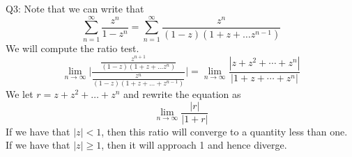 \documentclass[letterpaper]{article}
\begin{document}
\noindent
Q3: Note that we can write that $$\sum_{n=1}^\infty  \frac{z^n}{1-z^n}= \sum_{n=1}^\infty \frac{z^n}{(1-z)(1+ z + \dots z^{n-1})}$$
We will compute the ratio test. $$\lim_{n \to \infty} \Bigg|\frac{\frac{z^{n+1}}{(1-z)(1+ z + \dots z^n)}}{\frac{z^n}{(1-z)(1+ z + \dots + z^{n-1})}} \Bigg| = \lim_{n \to \infty} \frac{|z+ z^2 + \cdots+  z^{n}|}{|1+ z + \cdots + z^n |}$$
We let $r = z+ z^2 + \dots + z^n$ and rewrite the equation as $$\lim_{n\to \infty} \frac{|r|}{|1+r|}$$ If we have that $|z|<1$, then this ratio will converge to a quantity less than one. If we have that $|z|\geq 1$, then it will approach 1 and hence diverge. 
\end{document}
